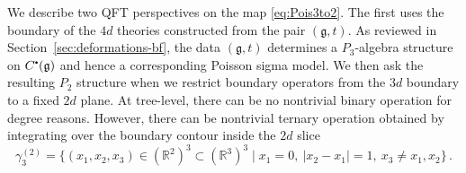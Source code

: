 \documentclass[11pt]{article}
\newcommand{\R}{\mathbb{R}}
\newcommand\sbullet[1][.5]{\mathbin{\vcenter{\hbox{\scalebox{#1}{$\bullet$}}}}}
\numberwithin{equation}{section}
\begin{document}
We describe two QFT perspectives on the map \eqref{eq:Pois3to2}. The first uses the boundary of the $4d$ theories constructed from the pair $(\mathfrak{g},t)$. As reviewed in Section~\ref{sec:deformations-bf}, the data $(\mathfrak{g},t)$ determines a $P_3$-algebra structure on $C^{\sbullet}(\mathfrak{g})$ and hence a corresponding Poisson sigma model. We then ask the resulting $P_2$ structure when we restrict boundary operators from the $3d$ boundary to a fixed $2d$ plane. At tree-level, there can be no nontrivial binary operation for degree reasons. However, there can be nontrivial ternary operation obtained by integrating over the boundary contour inside the $2d$ slice
\begin{equation}
	\gamma_3^{(2)} = \{(x_1,x_2,x_3) \in (\R^2)^3 \subset (\R^3)^3 \mid x_1 = 0,\ |x_2 - x_1| = 1,\ x_3 \neq x_1,x_2\}\,.
\end{equation}
\end{document}
